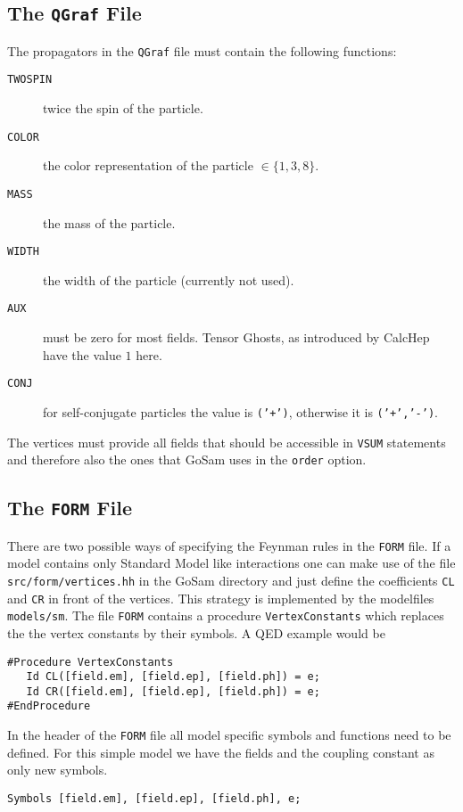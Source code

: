 \documentclass[11pt,a4paper]{refrep}
\newcommand{\gosamversion}{{2{.}0}}
\newcommand{\gosamv}[1][\gosamversion]{{\sc GoSam}\xspace}
\newcommand{\qgraf}{{\tt QGraf}\xspace}
\newcommand{\form}{{\tt FORM}\xspace}
\begin{document}
\subsection{The \qgraf{} File}
The propagators in the \qgraf{} file must contain the following functions:
\begin{description}
\item[\texttt{TWOSPIN}] twice the spin of the particle.
\item[\texttt{COLOR}]   the color representation of the particle $\in\{1,3,8\}$.
\item[\texttt{MASS}]    the mass of the particle.
\item[\texttt{WIDTH}]   the width of the particle (currently not used).
\item[\texttt{AUX}]     must be zero for most fields. Tensor Ghosts, as introduced
                        by CalcHep have the value $1$ here.
\item[\texttt{CONJ}]    for self-conjugate particles the value is \texttt{('+')},
                        otherwise it is \texttt{('+','-')}.
\end{description}

The vertices must provide all fields that should be accessible in \texttt{VSUM} statements
and therefore also the ones that \gosamv{} uses in the \texttt{order} option.

\subsection{The \form{} File}
There are two possible ways of specifying the Feynman rules in the \form{} file.
If a model contains only Standard Model like interactions one can make use of
the file \texttt{src/form/vertices.hh} in the \gosamv{} directory and just define
the coefficients \texttt{CL} and \texttt{CR} in front of the vertices. This
strategy is implemented by the modelfiles \texttt{models/sm}. The file
\form{} contains a procedure \texttt{VertexConstants} which
replaces the the vertex constants by their symbols. A QED example would be
\begin{lstlisting}[language=form]
#Procedure VertexConstants
   Id CL([field.em], [field.ep], [field.ph]) = e;
   Id CR([field.em], [field.ep], [field.ph]) = e;
#EndProcedure
\end{lstlisting}
In the header of the \form{} file all model specific
symbols and functions need to be defined. For this simple
model we have the fields and the coupling constant as only
new symbols.
\begin{lstlisting}[language=form]
Symbols [field.em], [field.ep], [field.ph], e;
\end{lstlisting}
\end{document}
